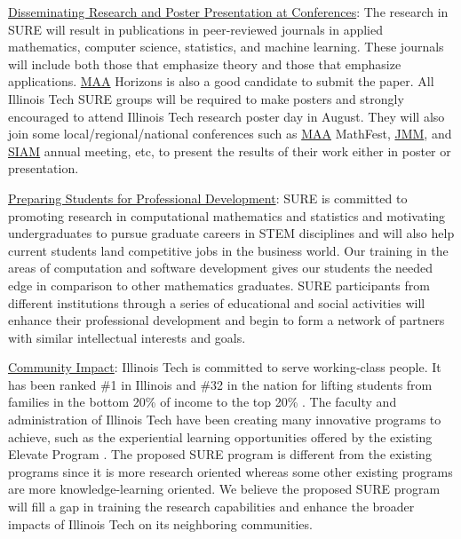 \documentclass[11pt]{NSFamsart}
\newcommand{\Upara}[1]{\noindent\underline{\upshape #1}:}
\newcommand{\MAA}{\hyperlink{MAAlink}{MAA}\xspace}
\newcommand{\JMM}{\hyperlink{JMMlink}{JMM}\xspace}
\newcommand{\SIAM}{\hyperlink{SIAMlink}{SIAM}\xspace}
\begin{document}
\Upara{Disseminating Research and Poster Presentation at Conferences}
The research in SURE will result in publications in peer-reviewed journals in applied mathematics, computer science, statistics, and machine learning. These journals will include both those that emphasize theory and those that emphasize applications. \MAA Horizons is also a good candidate to submit the paper. All Illinois Tech SURE groups will be required to make posters and strongly encouraged to attend Illinois Tech research poster day in August. They will also join some local/regional/national conferences such as \MAA MathFest, \JMM, and \SIAM annual meeting, etc, to present the results of their work either in poster or presentation.


\Upara{Preparing Students for Professional  Development} 
SURE is committed to promoting research in computational mathematics and statistics and motivating undergraduates to pursue graduate careers in STEM disciplines and will also help current students land competitive jobs in the business world. Our training in the areas of computation and software development gives our students the needed edge in comparison to other mathematics graduates. SURE participants from different institutions through a series of educational and social activities will enhance their professional development and begin to form a network of partners with similar intellectual interests and goals. 

\Upara{Community Impact}
Illinois Tech is committed to serve working-class people. 
It has been ranked \#1 in Illinois and \#32 in the nation for lifting students from families in the bottom 20\% of income to the top 20\% \cite{IITrank}. 
The faculty and administration of Illinois Tech have been creating many innovative programs to achieve, such as the experiential learning opportunities offered by the existing Elevate Program \cite{IITElevate}.
The proposed SURE program is different from the existing programs since it is more research oriented whereas some other existing programs are more knowledge-learning oriented. 
We believe the proposed SURE program will fill a gap in training the research capabilities and enhance the broader impacts of Illinois Tech on its neighboring communities. 
\end{document}
